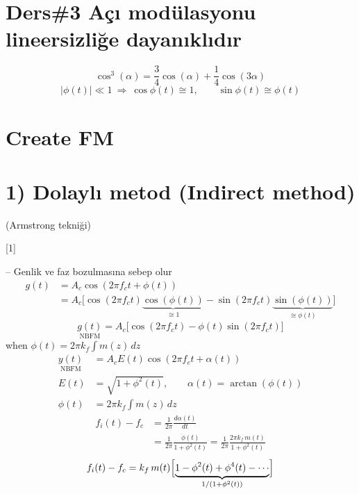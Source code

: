 \documentclass[11pt,a4paper]{article}
\begin{document}

\section{Ders\#3 Açı modülasyonu lineersizliğe dayanıklıdır}
\[ \cos^3(\alpha)=\frac34\cos(\alpha)+\frac14\cos(3\alpha) \]
\[ |\phi(t)|\ll1\ \Rightarrow\ \cos\phi(t)\cong1,\qquad \sin\phi(t)\cong\phi(t) \]

\section{Create FM}
\section{1) Dolaylı metod (Indirect method)}
(Armstrong tekniği)

[1]

-- Genlik ve faz bozulmasına sebep olur
\begin{align*}
g(t)&=A_c\cos(2\pi f_c t+\phi(t))\\
&=A_c\bigl[\cos(2\pi f_c t)\underbrace{\cos(\phi(t))}_{\cong1}-\sin(2\pi f_c t)\underbrace{\sin(\phi(t))}_{\cong\phi(t)}\bigr]
\end{align*}
\[
\underset{\text{NBFM}}{g(t)}=A_c\bigl[\cos(2\pi f_c t)-\phi(t)\sin(2\pi f_c t)\bigr]
\]
when $\phi(t)=2\pi k_f\int m(z)\,dz$
\begin{align*}
\underset{\text{NBFM}}{y(t)}&=A_cE(t)\cos(2\pi f_c t+\alpha(t))\\
E(t)&=\sqrt{1+\phi^2(t)},\qquad \alpha(t)=\arctan(\phi(t))\\
\phi(t)&=2\pi k_f\int m(z)\,dz
\end{align*}
\begin{align*}
f_i(t)-f_c&=\frac{1}{2\pi}\frac{d\alpha(t)}{dt}\\
&=\frac{1}{2\pi}\frac{\dot\phi(t)}{1+\phi^2(t)}=\frac{1}{2\pi}\frac{2\pi k_f\,m(t)}{1+\phi^2(t)}
\end{align*}
\[
f_i(t)-f_c=k_f\,m(t)\Bigl[\underbrace{1-\phi^2(t)+\phi^4(t)-\cdots}_{1/(1+\phi^2(t))}\Bigr]
\]
\end{document}
